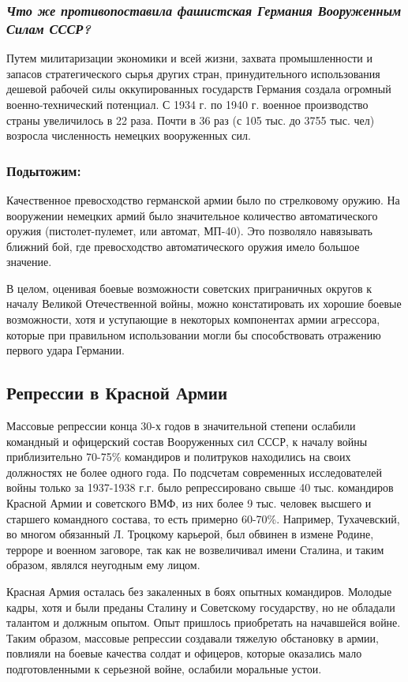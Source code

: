 \documentclass[12pt]{article}
\begin{document}
  \subsubsection*{\textit{Что же противопоставила фашистская Германия Вооруженным Силам СССР?}}
  Путем милитаризации экономики и всей жизни, захвата промышленности и запасов стратегического сырья других стран,
  принудительного использования дешевой рабочей силы оккупированных государств Германия создала огромный военно-технический потенциал.
  С 1934 г. по 1940 г. военное производство страны увеличилось в 22 раза.
  Почти в 36 раз (с 105 тыс. до 3755 тыс. чел) возросла численность немецких вооруженных сил.

  \subsubsection*{Подытожим:}
  Качественное превосходство германской армии было по стрелковому оружию.
  На вооружении немецких армий было значительное количество автоматического оружия (пистолет-пулемет, или автомат, МП-40).
  Это позволяло навязывать ближний бой, где превосходство автоматического оружия имело большое значение.

  В целом, оценивая боевые возможности советских приграничных округов к началу Великой Отечественной войны,
  можно констатировать их хорошие боевые возможности, хотя и уступающие в некоторых компонентах армии агрессора,
  которые при правильном использовании могли бы способствовать отражению первого удара Германии.

  \subsection{Репрессии в Красной Армии}
  Массовые репрессии конца 30-х годов в значительной степени ослабили командный и офицерский состав Вооруженных сил СССР,
  к началу войны приблизительно 70-75\% командиров и политруков находились на своих должностях не более одного года.
  По подсчетам современных исследователей войны только за 1937-1938 г.г. было репрессировано свыше 40 тыс. командиров Красной Армии
  и советского ВМФ, из них более 9 тыс. человек высшего и старшего командного состава, то есть примерно 60-70\%.
  Например, Тухачевский, во многом обязанный Л. Троцкому карьерой, был обвинен в измене Родине, терроре и военном заговоре,
  так как не возвеличивал имени Сталина, и таким образом, являлся неугодным ему лицом.

  Красная Армия осталась без закаленных в боях опытных командиров.
  Молодые кадры, хотя и были преданы Сталину и Советскому государству, но не обладали талантом и должным опытом.
  Опыт пришлось приобретать на начавшейся войне.
  Таким образом, массовые репрессии создавали тяжелую обстановку в армии, повлияли на боевые качества солдат и офицеров,
  которые оказались мало подготовленными к серьезной войне, ослабили моральные устои.
\end{document}
